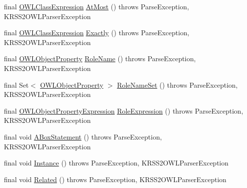 \begin{DoxyCompactItemize}
final \hyperlink{interfaceorg_1_1semanticweb_1_1owlapi_1_1model_1_1_o_w_l_class_expression}{O\-W\-L\-Class\-Expression} \hyperlink{classde_1_1uulm_1_1ecs_1_1ai_1_1owlapi_1_1krssparser_1_1_k_r_s_s2_parser_aff1d5f4ccbff788e580e695c3d2e5d71}{At\-Most} ()  throws Parse\-Exception,     K\-R\-S\-S2\-O\-W\-L\-Parser\-Exception 
\item 
final \hyperlink{interfaceorg_1_1semanticweb_1_1owlapi_1_1model_1_1_o_w_l_class_expression}{O\-W\-L\-Class\-Expression} \hyperlink{classde_1_1uulm_1_1ecs_1_1ai_1_1owlapi_1_1krssparser_1_1_k_r_s_s2_parser_a05e212ed21fb734bf5b82e6299af4ec0}{Exactly} ()  throws Parse\-Exception,     K\-R\-S\-S2\-O\-W\-L\-Parser\-Exception 
\item 
final \hyperlink{interfaceorg_1_1semanticweb_1_1owlapi_1_1model_1_1_o_w_l_object_property}{O\-W\-L\-Object\-Property} \hyperlink{classde_1_1uulm_1_1ecs_1_1ai_1_1owlapi_1_1krssparser_1_1_k_r_s_s2_parser_aad04ffd748f23587be14e99471d43d86}{Role\-Name} ()  throws Parse\-Exception,     K\-R\-S\-S2\-O\-W\-L\-Parser\-Exception 
\item 
final Set$<$ \hyperlink{interfaceorg_1_1semanticweb_1_1owlapi_1_1model_1_1_o_w_l_object_property}{O\-W\-L\-Object\-Property} $>$ \hyperlink{classde_1_1uulm_1_1ecs_1_1ai_1_1owlapi_1_1krssparser_1_1_k_r_s_s2_parser_af6396c19a76e84a7bcddb7270bef6295}{Role\-Name\-Set} ()  throws Parse\-Exception,     K\-R\-S\-S2\-O\-W\-L\-Parser\-Exception 
\item 
final \hyperlink{interfaceorg_1_1semanticweb_1_1owlapi_1_1model_1_1_o_w_l_object_property_expression}{O\-W\-L\-Object\-Property\-Expression} \hyperlink{classde_1_1uulm_1_1ecs_1_1ai_1_1owlapi_1_1krssparser_1_1_k_r_s_s2_parser_a68a08e8c7e51f6c8c6dfe35a1534a9a1}{Role\-Expression} ()  throws Parse\-Exception,     K\-R\-S\-S2\-O\-W\-L\-Parser\-Exception 
\item 
final void \hyperlink{classde_1_1uulm_1_1ecs_1_1ai_1_1owlapi_1_1krssparser_1_1_k_r_s_s2_parser_a1576d29031875dab093bd74728f8ffda}{A\-Box\-Statement} ()  throws Parse\-Exception, K\-R\-S\-S2\-O\-W\-L\-Parser\-Exception 
\item 
final void \hyperlink{classde_1_1uulm_1_1ecs_1_1ai_1_1owlapi_1_1krssparser_1_1_k_r_s_s2_parser_a37be38d536341994da67768069dd3f32}{Instance} ()  throws Parse\-Exception, K\-R\-S\-S2\-O\-W\-L\-Parser\-Exception 
\item 
final void \hyperlink{classde_1_1uulm_1_1ecs_1_1ai_1_1owlapi_1_1krssparser_1_1_k_r_s_s2_parser_ad752d3a3a99235c665c370218850ec78}{Related} ()  throws Parse\-Exception, K\-R\-S\-S2\-O\-W\-L\-Parser\-Exception 

\end{DoxyCompactItemize}
